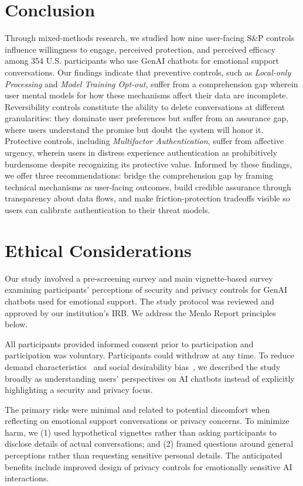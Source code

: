 \documentclass[letterpaper,twocolumn,10pt]{article}
\begin{document}
\section{Conclusion}

Through mixed-methods research, we studied how nine user-facing S\&P controls influence willingness to engage, perceived protection, and perceived efficacy among 354 U.S. participants who use GenAI chatbots for emotional support conversations. Our findings indicate that preventive controls, such as \emph{Local-only Processing} and \emph{Model Training Opt-out}, suffer from a comprehension gap wherein user mental models for how these mechanisms affect their data are incomplete. Reversibility controls constitute the ability to delete conversations at different granularities: they dominate user preferences but suffer from an assurance gap, where users understand the promise but doubt the system will honor it. Protective controls, including \emph{Multifactor Authentication}, suffer from affective urgency, wherein users in distress experience authentication as prohibitively burdensome despite recognizing its protective value. Informed by these findings, we offer three recommendations: bridge the comprehension gap by framing technical mechanisms as user-facing outcomes, build credible assurance through transparency about data flows, and make friction-protection tradeoffs visible so users can calibrate authentication to their threat models.

\section*{Ethical Considerations} \label{sec:ethics}

Our study involved a pre-screening survey and main vignette-based survey examining participants' perceptions of security and privacy controls for GenAI chatbots used for emotional support. The study protocol was reviewed and approved by our institution's IRB. We address the Menlo Report principles below.

 All participants provided informed consent prior to participation and participation was voluntary. Participants could withdraw at any time. To reduce demand characteristics~\cite{orne2009demand} and social desirability bias~\cite{nederhof1985methods}, we described the study broadly as understanding users' perspectives on AI chatbots instead of explicitly highlighting a security and privacy focus.

 The primary risks were minimal and related to potential discomfort when reflecting on emotional support conversations or privacy concerns. To minimize harm, we (1) used hypothetical vignettes rather than asking participants to disclose details of actual conversations; and (2) framed questions around general perceptions rather than requesting sensitive personal details. The anticipated benefits include improved design of privacy controls for emotionally sensitive AI interactions.
\end{document}
